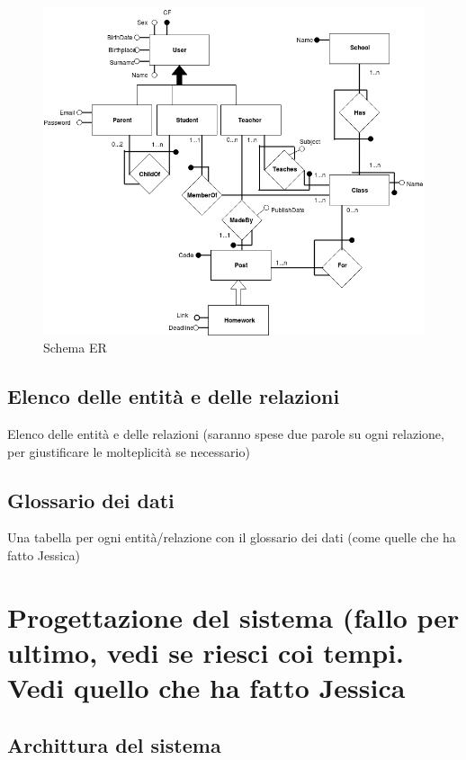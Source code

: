 \documentclass[Lau, binding=0.6cm]{sapthesis}
\begin{document}
\begin{figure}[H]
	\centering
	\includegraphics[width=1\linewidth]{images/db_HiSchool.png} 
	\caption{Schema ER}
	\label{fig:schema_ER}
\end{figure}

\section{Elenco delle entità e delle relazioni}

Elenco delle entità e delle relazioni (saranno spese due parole su ogni relazione, per giustificare le molteplicità se necessario) 

\section{Glossario dei dati}

Una tabella per ogni entità/relazione con il glossario dei dati (come quelle che ha fatto Jessica)

\chapter{Progettazione del sistema (fallo per ultimo, vedi se riesci coi tempi. Vedi quello che ha fatto Jessica}

\section{Archittura del sistema}
\end{document}
